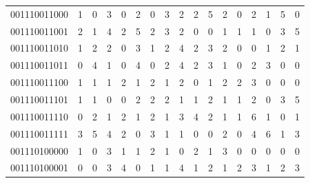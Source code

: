 \documentclass[10pt,a4paper]{article}
\begin{document}
\begin{longtable}{ |c|c|c|c|c|c|c|c|c|c|c|c|c|c|c|c|c| }
    001110011000              & 1                            & 0                                & 3                            & 0                              & 2   & 0   & 3   & 2   & 2   & 5   & 2   & 0   & 2   & 1   & 5   & 0   \\
    001110011001              & 2                            & 1                                & 4                            & 2                              & 5   & 2   & 3   & 2   & 0   & 0   & 1   & 1   & 1   & 0   & 3   & 5   \\
    001110011010              & 1                            & 2                                & 2                            & 0                              & 3   & 1   & 2   & 4   & 2   & 3   & 2   & 0   & 0   & 1   & 2   & 1   \\
    001110011011              & 0                            & 4                                & 1                            & 0                              & 4   & 0   & 2   & 4   & 2   & 3   & 1   & 0   & 2   & 3   & 0   & 0   \\
    001110011100              & 1                            & 1                                & 1                            & 2                              & 1   & 2   & 1   & 2   & 0   & 1   & 2   & 2   & 3   & 0   & 0   & 0   \\
    001110011101              & 1                            & 1                                & 0                            & 0                              & 2   & 2   & 2   & 1   & 1   & 2   & 1   & 1   & 2   & 0   & 3   & 5   \\
    001110011110              & 0                            & 2                                & 1                            & 2                              & 1   & 2   & 1   & 3   & 4   & 2   & 1   & 1   & 6   & 1   & 0   & 1   \\
    001110011111              & 3                            & 5                                & 4                            & 2                              & 0   & 3   & 1   & 1   & 0   & 0   & 2   & 0   & 4   & 6   & 1   & 3   \\
    001110100000              & 1                            & 0                                & 3                            & 1                              & 1   & 2   & 1   & 0   & 2   & 1   & 3   & 0   & 0   & 0   & 0   & 0   \\
    001110100001              & 0                            & 0                                & 3                            & 4                              & 0   & 1   & 1   & 4   & 1   & 2   & 1   & 2   & 3   & 1   & 2   & 3   \\

\end{longtable}
\end{document}
